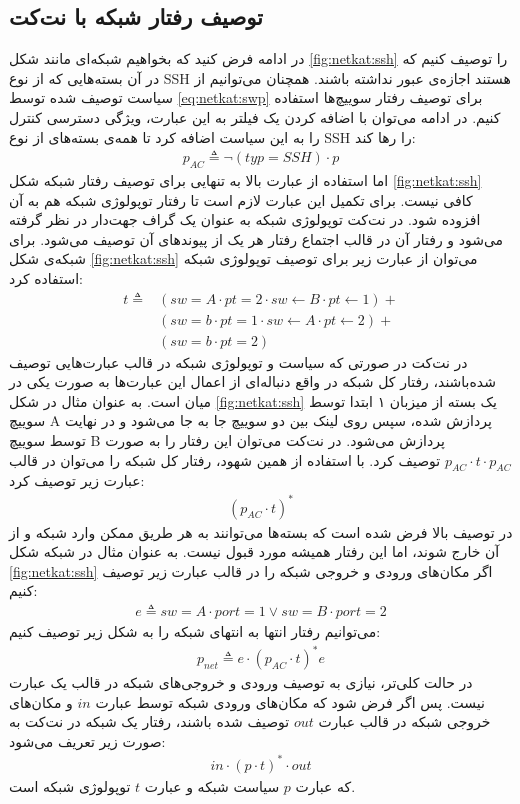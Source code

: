 \documentclass[
msc,
irfonts
]{./tex/tehran-thesis}
\newcommand{\پ}{پروژه/پایان‌نامه/رساله }
\theoremstyle{definition}
\theoremstyle{theorem}
\theoremstyle{definition}
\numberwithin{algorithm}{chapter}
\newcommand{\la}{\leftarrow}
\newcommand{\lf}[1]{\LTRfootnote{#1}}
\begin{document}
\subsection{توصیف رفتار شبکه با نت‌کت}
در ادامه فرض کنید که بخواهیم شبکه‌ای مانند شکل
\ref{fig:netkat:ssh}
را توصیف کنیم که در آن بسته‌هایی که از نوع
SSH
هستند اجازه‌ی عبور نداشته باشند.
همچنان می‌توانیم از سیاست توصیف شده توسط
\ref{eq:netkat:swp}
برای توصیف رفتار سوییچ‌ها استفاده کنیم.
در ادامه می‌توان با اضافه کردن یک فیلتر به این عبارت، ویژگی دسترسی کنترل\lf{Access Control}
را به این سیاست اضافه کرد تا همه‌ی بسته‌های از نوع
SSH
را رها کند:
\begin{align*}
    p_{AC} \triangleq \neg(typ = SSH)\cdot p
\end{align*}
اما استفاده از عبارت بالا به تنهایی برای توصیف رفتار شبکه شکل
\ref{fig:netkat:ssh}
کافی‌ نیست.
برای تکمیل این عبارت لازم است تا رفتار توپولوژی\lf{Topology}
شبکه‌ هم به آن افزوده شود.
در نت‌کت توپولوژی شبکه به عنوان یک گراف جهت‌دار در نظر گرفته می‌شود و رفتار آن در قالب اجتماع رفتار هر یک از پیوندهای\lf{Link}
آن توصیف می‌شود.
برای شبکه‌ی شکل
\ref{fig:netkat:ssh}
می‌توان از عبارت زیر برای توصیف توپولوژی شبکه استفاده کرد:
\begin{align*}
    t \triangleq & (sw = A \cdot pt = 2 \cdot sw \la B \cdot pt \la 1) + \\
                 & (sw = b \cdot pt = 1 \cdot sw \la A \cdot pt \la 2) + \\
                 & (sw = b \cdot pt = 2)
\end{align*}
در نت‌کت در صورتی که سیاست و توپولوژی شبکه در قالب عبارت‌هایی توصیف شده‌باشند،
رفتار کل شبکه در واقع دنباله‌ای از اعمال این عبارت‌ها به صورت یکی در میان است.
به عنوان مثال در شکل
\ref{fig:netkat:ssh}
یک بسته از میزبان ۱ ابتدا توسط سوییچ
A
پردازش شده، سپس روی لینک بین دو سوییچ جا به جا می‌شود و در نهایت توسط سوییچ
B
پردازش می‌شود.
در نت‌کت می‌توان این رفتار را به صورت
$p_{AC}\cdot t \cdot p_{AC}$
توصیف کرد.
با استفاده از همین شهود، رفتار کل شبکه را می‌توان در قالب عبارت زیر توصیف کرد:
\begin{align*}
    (p_{AC}\cdot t)^*
\end{align*}
در توصیف بالا فرض شده است که بسته‌ها می‌توانند به هر طریق ممکن وارد شبکه و از آن خارج شوند، اما این رفتار همیشه مورد قبول نیست.
به عنوان مثال در شبکه شکل
\ref{fig:netkat:ssh}
اگر مکان‌های ورودی و خروجی شبکه را در قالب عبارت زیر توصیف کنیم:
\begin{align*}
    e \triangleq sw = A\cdot port = 1 \vee sw = B \cdot port = 2
\end{align*}
می‌توانیم رفتار انتها به انتهای\lf{End to End}
شبکه را به شکل زیر توصیف کنیم:
\begin{align*}
    p_{net} \triangleq e \cdot (p_{AC}\cdot t)^* e
\end{align*}
در حالت کلی‌تر، نیازی به توصیف ورودی و خروجی‌های شبکه در قالب یک عبارت نیست.
پس اگر فرض شود که مکان‌های ورودی شبکه توسط عبارت
$in$
و مکان‌های خروجی شبکه در قالب عبارت
$out$
توصیف شده‌ باشند، رفتار یک شبکه در نت‌کت به صورت زیر تعریف می‌شود:
\begin{align*}
    in \cdot (p\cdot t)^*\cdot out
\end{align*}
که عبارت
$p$
سیاست شبکه و عبارت
$t$
توپولوژی شبکه است.
\end{document}
